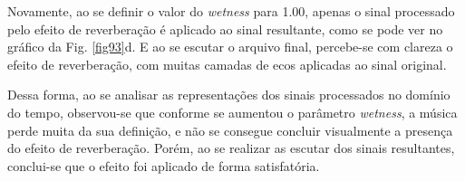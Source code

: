
Novamente, ao se definir o valor do \textit{wetness} para 1.00, apenas o sinal processado pelo efeito de reverberação é aplicado ao sinal resultante, como se pode ver no gráfico da Fig. \ref{fig93}d. E ao se escutar o arquivo final, percebe-se com clareza o efeito de reverberação, com muitas camadas de ecos aplicadas ao sinal original.


Dessa forma, ao se analisar as representações dos sinais processados no domínio do tempo, observou-se que conforme se aumentou o parâmetro \textit{wetness}, a música perde muita da sua definição, e não se consegue concluir visualmente a presença do efeito de reverberação. Porém, ao se realizar as escutar dos sinais resultantes, conclui-se que o efeito foi aplicado de forma satisfatória.